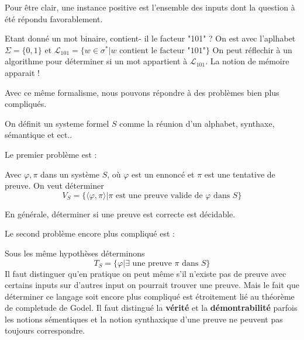 Pour être clair, une instance positive est l'ensemble des inputs dont la question à été répondu favorablement.

\begin{exemple}
    Etant donné un mot binaire, contient- il le facteur "101" ?
    On est avec l'aplhabet $\Sigma = \{0,1\}$ et $\mathcal{L}_{101} = \{w\in \sigma^* | w \text{ contient le facteur "101"}\}$
    On peut réflechir à un algorithme pour déterminer si un mot appartient à $ \mathcal{L}_{101}$. La notion de mémoire apparait !
\end{exemple}

Avec ce même formalisme, nous pouvons répondre à des problèmes bien plus compliqués.

\begin{definition}
    On  définit un systeme formel $S$ comme la réunion d'un alphabet, synthaxe, sémantique et ect..
\end{definition}

Le premier problème est :

Avec $\varphi, \pi$ dans un système $S$, où $\varphi$ est un ennoncé et $\pi$ est une tentative de preuve. On veut déterminer
$$
V_S = \{\langle \varphi, \pi \rangle | \pi \text{ est une preuve valide de } \varphi\text{ dans } S \}
$$

En générale, déterminer si une preuve est correcte est décidable.

Le second problème encore plus compliqué est :


Sous les même hypothèses déterminons $$T_S = \{\varphi | \exists \text{ une preuve } \pi \text{ dans } S\}$$
Il faut distinguer qu'en pratique on peut même s'il n'existe pas de preuve avec certains inputs sur d'autres input on pourrait trouver une preuve. Mais le fait que déterminer ce langage soit encore plus compliqué est étroitement lié au théorème de completude de Godel.
Il faut distingué la \textbf{vérité} et la \textbf{démontrabilité} parfois les notions sémentiques et la notion synthaxique d'une preuve ne peuvent pas toujours correspondre.


